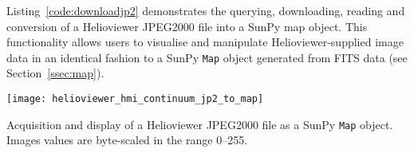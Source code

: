 Listing~\ref{code:downloadjp2} demonstrates the querying, downloading,
reading and conversion of a Helioviewer JPEG2000 file into a SunPy map
object.  This functionality allows users to visualise and manipulate
Helioviewer-supplied image data in an identical fashion to a SunPy \texttt{Map}
object generated from FITS data (see Section~\ref{ssec:map}).

\begin{listing}[H]
\begin{center}
\texttt{[image: helioviewer\_hmi\_continuum\_jp2\_to\_map]}
\end{center}
\caption{Acquisition and display of a Helioviewer JPEG2000 file as a
  SunPy \texttt{Map} object. Images values are byte-scaled in the range 0--255.}
\label{code:downloadjp2}
\end{listing}
